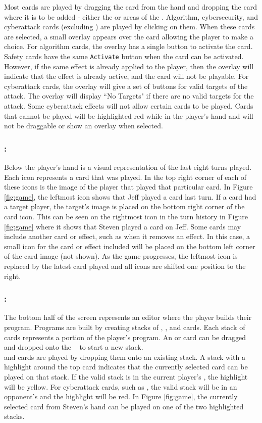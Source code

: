 Most cards are played by dragging the card from the hand and dropping the card where it is to be added - either the \Play or \MS areas of the \Prg. Algorithm, cybersecurity, and cyberattack cards (excluding \Vins) are played by clicking on them. When these cards are selected, a small overlay appears over the card allowing the player to make a choice. For algorithm cards, the overlay has a single button to activate the card. Safety cards have the same \texttt{Activate} button when the card can be activated. However, if the same effect is already applied to the player, then the overlay will indicate that the effect is already active, and the card will not be playable. For cyberattack cards, the overlay will give a set of buttons for valid targets of the attack. The overlay will display ``No Targets" if there are no valid targets for the attack. Some cyberattack effects will not allow certain cards to be played. Cards that cannot be played will be highlighted red while in the player's hand and will not be draggable or show an overlay when selected.

\subsubsection{\Hist:}
Below the player's hand is a visual representation of the last eight turns played. Each icon represents a card that was played. In the top right corner of each of these icons is the image of the player that played that particular card. In Figure \ref{fig:game}, the leftmost icon shows that Jeff played a \M card last turn. If a card had a target player, the target's image is placed on the bottom right corner of the card icon. This can be seen on the rightmost icon in the turn history in Figure \ref{fig:game} where it shows that Steven played a \Spy card on Jeff. Some cards may include another card or effect, such as \Scan when it removes an effect. In this case, a small icon for the card or effect included will be placed on the bottom left corner of the card image (not shown). As the game progresses, the leftmost icon is replaced by the latest card played and all icons are shifted one position to the right.

\subsubsection{\Prg:}
The bottom half of the screen represents an editor where the player builds their program. Programs are built by creating stacks of \Ins, \Mns, \R and \V cards. Each stack of cards represents a portion of the player's program. An \I or \M card can be dragged and dropped onto the \Prg~ to start a new stack. \R \\
and \V cards are played by dropping them onto an existing stack. A stack with a highlight around the top card indicates that the currently selected card can be played on that stack. If the valid stack is in the current player's \Prg, the highlight will be yellow. For cyberattack cards, such as \Vins, the valid stack will be in an opponent's \Prg and the highlight will be red. In Figure \ref{fig:game}, the currently selected \R card from Steven's hand can be played on one of the two highlighted stacks.

